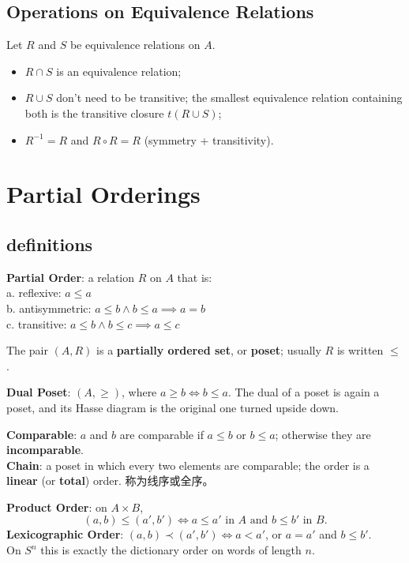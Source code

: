 \documentclass[12pt, a4paper, UTF8, openany]{ctexbook}
\newcommand{\field}[1]{\mathbb{#1}}%
\begin{document}
        \subsection{Operations on Equivalence Relations}
            Let $R$ and $S$ be equivalence relations on $A$.
            \begin{itemize}
                \item $R \cap S$ is an equivalence relation;
                \item $R \cup S$ don't need to be transitive; the smallest equivalence relation containing both is the transitive closure $t(R \cup S)$;
                \item $R^{-1} = R$ and $R \circ R = R$ (symmetry + transitivity).
            \end{itemize}

    \section{Partial Orderings}
    \subsection{definitions}
        \textbf{Partial Order}: a relation $R$ on $A$ that is:\\
        a. reflexive: $a \leqslant a$\\
        b. antisymmetric: $a \leqslant b \land b \leqslant a \implies a = b$\\
        c. transitive: $a \leqslant b \land b \leqslant c \implies a \leqslant c$

        The pair $(A, R)$ is a \textbf{partially ordered set}, or \textbf{poset}; usually $R$ is written $\leqslant$.


        \textbf{Dual Poset}: $(A, \geqslant)$, where $a \geqslant b \iff b \leqslant a$. The dual of a poset is again a poset, and its Hasse diagram is the original one turned upside down.

        \textbf{Comparable}: $a$ and $b$ are comparable if $a \leqslant b$ or $b \leqslant a$; otherwise they are \textbf{incomparable}. \\
        \textbf{Chain}: a poset in which every two elements are comparable; the order is a \textbf{linear} (or \textbf{total}) order. 称为线序或全序。

        \textbf{Product Order}: on $A \times B$,
        $$ (a, b) \leqslant (a', b') \iff a \leqslant a' \text{ in } A \text{ and } b \leqslant b' \text{ in } B. $$
        \textbf{Lexicographic Order}: $(a, b) \prec (a', b') \iff a < a'$, or $a = a'$ and $b \leqslant b'$. \\
        On $S^n$ this is exactly the dictionary order on words of length $n$.
\end{document}
